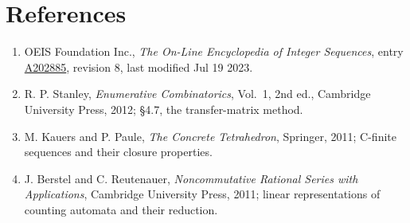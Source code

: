\documentclass[11pt]{article}
\theoremstyle{definition}
\begin{document}
\section{References}

\begin{enumerate}

\item OEIS Foundation Inc., \emph{The On-Line Encyclopedia of Integer Sequences}, entry \href{https://oeis.org/A202885}{A202885}, revision 8, last modified Jul 19 2023.

\item R. P. Stanley, \emph{Enumerative Combinatorics}, Vol.~1, 2nd ed., Cambridge University Press, 2012; \S4.7, the transfer-matrix method.

\item M. Kauers and P. Paule, \emph{The Concrete Tetrahedron}, Springer, 2011; C-finite sequences and their closure properties.

\item J. Berstel and C. Reutenauer, \emph{Noncommutative Rational Series with Applications}, Cambridge University Press, 2011; linear representations of counting automata and their reduction.

\end{enumerate}
\end{document}
